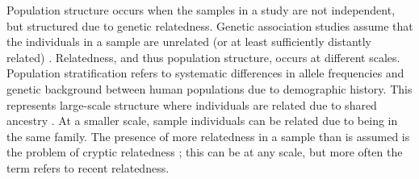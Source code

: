 Population structure occurs when the samples in a study are not independent, but structured due to genetic relatedness.
Genetic association studies assume that the individuals in a sample are unrelated (or at least sufficiently distantly related) \autocite{astle2009PopulationStructureCryptic,sillanpaa2011OverviewTechniquesAccount,sul2018PopulationStructureGenetic}.
Relatedness, and thus population structure, occurs at different scales.
Population stratification refers to systematic differences in allele frequencies and genetic background between human populations due to demographic history.
This represents large-scale structure where individuals are related due to shared ancestry \autocite{price2010NewApproachesPopulation,sillanpaa2011OverviewTechniquesAccount}.
At a smaller scale, sample individuals can be related due to being in the same family.
The presence of more relatedness in a sample than is assumed is the problem of cryptic relatedness \autocite{astle2009PopulationStructureCryptic,sillanpaa2011OverviewTechniquesAccount,sul2018PopulationStructureGenetic};
this can be at any scale, but more often the term refers to recent relatedness.

